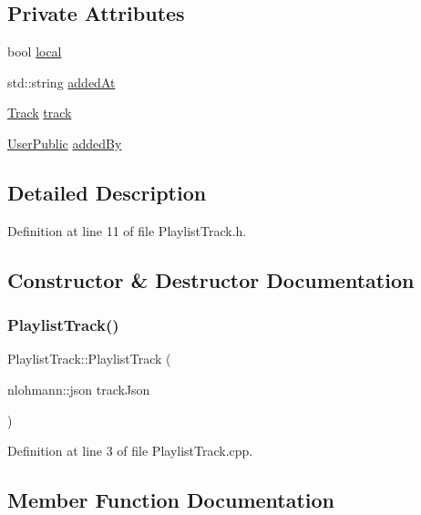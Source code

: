 \subsection*{Private Attributes}
\begin{DoxyCompactItemize}
\item 
bool \mbox{\hyperlink{class_playlist_track_a0d58a78062e837bd33ce1821cff096d6}{local}}
\item 
std\+::string \mbox{\hyperlink{class_playlist_track_a030c354351b251c0f64b74d3aae053ea}{added\+At}}
\item 
\mbox{\hyperlink{class_track}{Track}} \mbox{\hyperlink{class_playlist_track_a34b14728e12dcf181899b7eaa7ac7f81}{track}}
\item 
\mbox{\hyperlink{class_user_public}{User\+Public}} \mbox{\hyperlink{class_playlist_track_a735f9e2c7febfedd9d0c96e79c1d08c2}{added\+By}}
\end{DoxyCompactItemize}


\subsection{Detailed Description}


Definition at line 11 of file Playlist\+Track.\+h.



\subsection{Constructor \& Destructor Documentation}
\mbox{\label{class_playlist_track_ac1ba89a8b37d090beb680c4343eb6502}} 
\subsubsection{\texorpdfstring{Playlist\+Track()}{PlaylistTrack()}}
{\footnotesize\ttfamily Playlist\+Track\+::\+Playlist\+Track (\begin{DoxyParamCaption}\item[{nlohmann\+::json}]{track\+Json }\end{DoxyParamCaption})}



Definition at line 3 of file Playlist\+Track.\+cpp.



\subsection{Member Function Documentation}
\mbox{\label{class_playlist_track_ad0cc1579fe0b84b91dd7a3dc882417e1}} 
